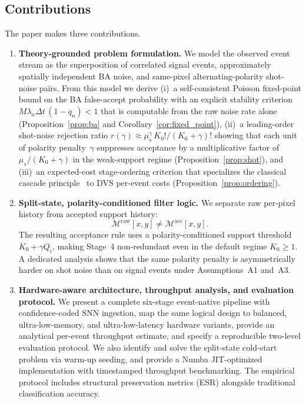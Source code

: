 \documentclass[a4paper,fleqn]{cas-dc}
\begin{document}
\subsection{Contributions}
\label{sec:contributions}

The paper makes three contributions.

\begin{enumerate}
\item \textbf{Theory-grounded problem formulation.} We model the observed event stream as the superposition of correlated signal events, approximately spatially independent BA noise, and same-pixel alternating-polarity shot-noise pairs. From this model we derive (i)~a self-consistent Poisson fixed-point bound on the BA false-accept probability with an explicit stability criterion $M\lambda_n\Delta t\,(1-q_n)<1$ that is computable from the raw noise rate alone (Proposition~\ref{prop:ba} and Corollary~\ref{cor:fixed_point}), (ii)~a leading-order shot-noise rejection ratio $r(\gamma)\approx \mu_s^{\gamma}\,K_0!/(K_0+\gamma)!$ showing that each unit of polarity penalty~$\gamma$ suppresses acceptance by a multiplicative factor of $\mu_s/(K_0+\gamma)$ in the weak-support regime (Proposition~\ref{prop:shot}), and (iii)~an expected-cost stage-ordering criterion that specializes the classical cascade principle~\citep{viola2001rapid} to DVS per-event costs (Proposition~\ref{prop:ordering}).

\item \textbf{Split-state, polarity-conditioned filter logic.} We separate raw per-pixel history from accepted support history:
\[
\mathcal{M}^{\text{raw}}[x,y] \neq \mathcal{M}^{\text{acc}}[x,y].
\]
The resulting acceptance rule uses a polarity-conditioned support threshold $K_0 + \gamma Q_i$, making Stage~4 non-redundant even in the default regime $K_0 \geq 1$. A dedicated analysis shows that the same polarity penalty is asymmetrically harder on shot noise than on signal events under Assumptions~A1 and~A3.

\item \textbf{Hardware-aware architecture, throughput analysis, and evaluation protocol.} We present a complete six-stage event-native pipeline with confidence-coded SNN ingestion, map the same logical design to balanced, ultra-low-memory, and ultra-low-latency hardware variants, provide an analytical per-event throughput estimate, and specify a reproducible two-level evaluation protocol. We also identify and solve the split-state cold-start problem via warm-up seeding, and provide a Numba JIT-optimized implementation with timestamped throughput benchmarking. The empirical protocol includes structural preservation metrics (ESR) alongside traditional classification accuracy.
\end{enumerate}
\end{document}
